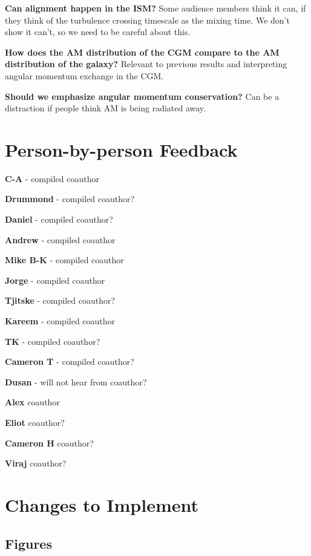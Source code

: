 \textbf{Can alignment happen in the ISM?}
Some audience members think it can, if they think of the turbulence crossing timescale as the mixing time.
We don't show it can't, so we need to be careful about this.

\textbf{How does the AM distribution of the CGM compare to the AM distribution of the galaxy?}
Relevant to previous results and interpreting angular momentum exchange in the CGM.

\textbf{Should we emphasize angular momentum conservation?}
Can be a distraction if people think AM is being radiated away.

\section{Person-by-person Feedback}

\textbf{C-A} - compiled
coauthor

\textbf{Drummond} - compiled
coauthor?

\textbf{Daniel} - compiled
coauthor?

\textbf{Andrew} - compiled
coauthor

\textbf{Mike B-K} - compiled
coauthor

\textbf{Jorge} - compiled
coauthor

\textbf{Tjitske} - compiled
coauthor?

\textbf{Kareem} - compiled
coauthor

\textbf{TK} - compiled
coauthor?

\textbf{Cameron T} - compiled
coauthor?

\textbf{Dusan} - will not hear from
coauthor?

\textbf{Alex}
coauthor

\textbf{Eliot}
coauthor?

\textbf{Cameron H}
coauthor?

\textbf{Viraj}
coauthor?

\section{Changes to Implement}

\subsection{Figures}



